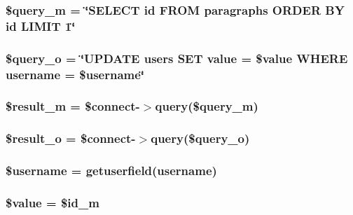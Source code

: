 \subsubsection[{\texorpdfstring{\$query\+\_\+m}{$query_m}}]{\setlength{\rightskip}{0pt plus 5cm}\$query\+\_\+m = \char`\"{}S\+E\+L\+E\+CT id F\+R\+OM paragraphs O\+R\+D\+ER BY id L\+I\+M\+IT 1\char`\"{}}\hypertarget{logout_8php_ae329f02109ed78272a42886c98df3bd9}{}\label{logout_8php_ae329f02109ed78272a42886c98df3bd9}
\subsubsection[{\texorpdfstring{\$query\+\_\+o}{$query_o}}]{\setlength{\rightskip}{0pt plus 5cm}\$query\+\_\+o = \char`\"{}U\+P\+D\+A\+TE users S\+ET value = \textquotesingle{}\$value\textquotesingle{} W\+H\+E\+RE username = \textquotesingle{}\$username\textquotesingle{}\char`\"{}}\hypertarget{logout_8php_aeabafca44a286021e5053d90b7ac02c2}{}\label{logout_8php_aeabafca44a286021e5053d90b7ac02c2}
\subsubsection[{\texorpdfstring{\$result\+\_\+m}{$result_m}}]{\setlength{\rightskip}{0pt plus 5cm}\$result\+\_\+m = \$connect-\/$>$query(\$query\+\_\+m)}\hypertarget{logout_8php_ad115cd7edecc850395803ef46988df70}{}\label{logout_8php_ad115cd7edecc850395803ef46988df70}
\subsubsection[{\texorpdfstring{\$result\+\_\+o}{$result_o}}]{\setlength{\rightskip}{0pt plus 5cm}\$result\+\_\+o = \$connect-\/$>$query(\$query\+\_\+o)}\hypertarget{logout_8php_abfea95b9a9b54de82d704c5e99871497}{}\label{logout_8php_abfea95b9a9b54de82d704c5e99871497}
\subsubsection[{\texorpdfstring{\$username}{$username}}]{\setlength{\rightskip}{0pt plus 5cm}\$username = getuserfield(\textquotesingle{}username\textquotesingle{})}\hypertarget{logout_8php_a0eb82aa5f81cf845de4b36cd653c42cf}{}\label{logout_8php_a0eb82aa5f81cf845de4b36cd653c42cf}
\subsubsection[{\texorpdfstring{\$value}{$value}}]{\setlength{\rightskip}{0pt plus 5cm}\$value = \$id\+\_\+m}\hypertarget{logout_8php_a0f298096f322952a72a50f98a74c7b60}{}\label{logout_8php_a0f298096f322952a72a50f98a74c7b60}
